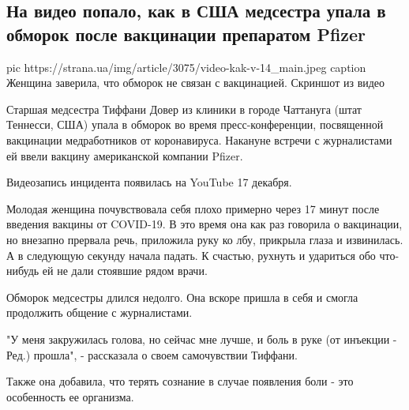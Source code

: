  
 
 
 
 
 
\subsection{На видео попало, как в США медсестра упала в обморок после вакцинации препаратом Pfizer}
\label{sec:18_12_2020.news.ua.strana.3.pfizer_vaccine_obmorok}

\ifcmt
pic https://strana.ua/img/article/3075/video-kak-v-14_main.jpeg
caption Женщина заверила, что обморок не связан с вакцинацией. Скриншот из видео 
\fi

Старшая медсестра Тиффани Довер из клиники в городе Чаттануга (штат Теннесси,
США) упала в обморок во время пресс-конференции, посвященной вакцинации
медработников от коронавируса. Накануне встречи с журналистами ей ввели вакцину
американской компании Pfizer. 

Видеозапись инцидента появилась на YouTube 17 декабря.

Молодая женщина почувствовала себя плохо примерно через 17 минут после введения
вакцины от COVID-19. В это время она как раз говорила о вакцинации, но внезапно
прервала речь, приложила руку ко лбу, прикрыла глаза и извинилась. А в
следующую секунду начала падать. К счастью, рухнуть и удариться обо что-нибудь
ей не дали стоявшие рядом врачи.

Обморок медсестры длился недолго. Она вскоре пришла в себя и смогла продолжить
общение с журналистами.

"У меня закружилась голова, но сейчас мне лучше, и боль в руке (от инъекции -
Ред.) прошла", - рассказала о своем самочувствии Тиффани.

Также она добавила, что терять сознание в случае появления боли - это
особенность ее организма.


